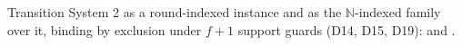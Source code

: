 \begin{definition}
  \label{def:aba-gbca-spec}
  \leanok
  Transition System 2 as a round-indexed instance and as the $\mathbb{N}$-indexed family over it, binding by exclusion under $f{+}1$ support guards (D14, D15, D19):  and .
\end{definition}
